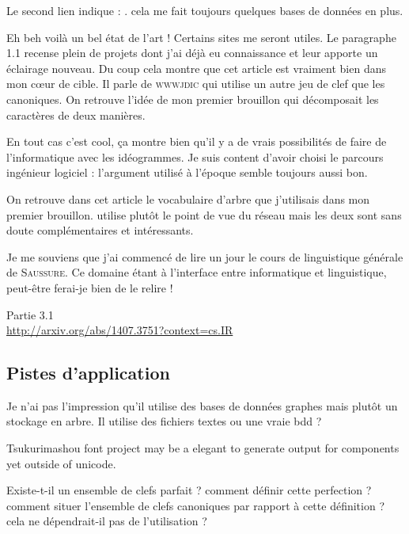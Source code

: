 Le second lien indique : . cela me fait toujours quelques bases de données en plus.

Eh beh voilà un bel état de l'art ! Certains sites me seront utiles. Le paragraphe 1.1 recense plein de projets dont j'ai déjà eu connaissance et leur apporte un éclairage nouveau. Du coup cela montre que cet article est vraiment bien dans mon cœur de cible. Il parle de \textsc{wwwjdic} qui utilise un autre jeu de clef que les canoniques. On retrouve l'idée de mon premier brouillon qui décomposait les caractères de deux manières.

En tout cas c'est cool, ça montre bien qu'il y a de vrais possibilités de faire de l'informatique avec les idéogrammes. Je suis content d'avoir choisi le parcours ingénieur logiciel : l'argument utilisé à l'époque semble toujours aussi bon.

On retrouve dans cet article le vocabulaire d'arbre que j'utilisais dans mon premier brouillon.  utilise plutôt le point de vue du réseau mais les deux sont sans doute complémentaires et intéressants.

Je me souviens que j'ai commencé de lire un jour le cours de linguistique générale de \textsc{Saussure}. Ce domaine étant à l'interface entre informatique et linguistique, peut-être ferai-je bien de le relire !

Partie 3.1\\
\url{http://arxiv.org/abs/1407.3751?context=cs.IR}

\subsection{Pistes d'application}
Je n'ai pas l'impression qu'il utilise des bases de données graphes mais plutôt un stockage en arbre. Il utilise des fichiers textes ou une vraie bdd ?

Tsukurimashou font project may be a elegant to generate output for components yet outside of unicode.

Existe-t-il un ensemble de clefs parfait ? comment définir cette perfection ? comment situer l'ensemble de clefs canoniques par rapport à cette définition ? cela ne dépendrait-il pas de l'utilisation ?